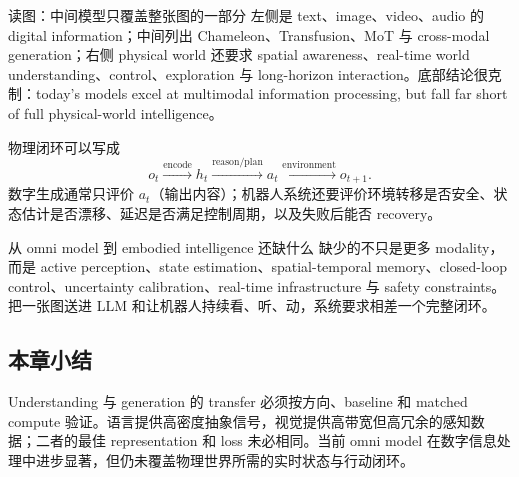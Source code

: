
\begin{knowledgebox}{读图：中间模型只覆盖整张图的一部分}
左侧是 text、image、video、audio 的 digital information；中间列出 Chameleon、Transfusion、MoT 与 cross-modal generation；右侧 physical world 还要求 spatial awareness、real-time world understanding、control、exploration 与 long-horizon interaction。底部结论很克制：today's models excel at multimodal information processing, but fall far short of full physical-world intelligence。
\end{knowledgebox}

物理闭环可以写成
$$
o_t\xrightarrow{\text{encode}}h_t
\xrightarrow{\text{reason/plan}}a_t
\xrightarrow{\text{environment}}o_{t+1}.
$$
数字生成通常只评价 $a_t$（输出内容）；机器人系统还要评价环境转移是否安全、状态估计是否漂移、延迟是否满足控制周期，以及失败后能否 recovery。

\begin{importantbox}{从 omni model 到 embodied intelligence 还缺什么}
缺少的不只是更多 modality，而是 active perception、state estimation、spatial-temporal memory、closed-loop control、uncertainty calibration、real-time infrastructure 与 safety constraints。把一张图送进 LLM 和让机器人持续看、听、动，系统要求相差一个完整闭环。
\end{importantbox}

\subsection{本章小结}

Understanding 与 generation 的 transfer 必须按方向、baseline 和 matched compute 验证。语言提供高密度抽象信号，视觉提供高带宽但高冗余的感知数据；二者的最佳 representation 和 loss 未必相同。当前 omni model 在数字信息处理中进步显著，但仍未覆盖物理世界所需的实时状态与行动闭环。

